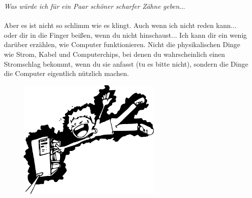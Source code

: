\emph{Was würde ich für ein Paar schöner scharfer Zähne geben$\ldots$}
\\
\\
Aber es ist nicht so schlimm wie es klingt. Auch wenn ich nicht reden kann... oder dir in die Finger beißen, wenn du nicht hinschaust... Ich kann dir ein wenig darüber erzählen, wie Computer funktionieren. Nicht die physikalischen Dinge wie Strom, Kabel und Computerchips, bei denen du wahrscheinlich einen Stromschlag bekommt, wenn du sie anfasst (tu es bitte nicht), sondern die Dinge die Computer eigentlich nützlich machen.

\begin{figure}
  \begin{center}
\includegraphics*[width=70mm]{images/electrocute}
  \end{center}
\end{figure}

